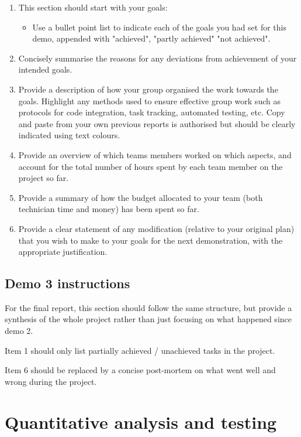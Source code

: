 \documentclass{article}
\begin{document}
\begin{enumerate}
    \item This section should start with your goals:
\begin{itemize}
    \item Use a bullet point list to indicate each of the goals you had set for this demo, appended with "achieved", "partly achieved" "not achieved".
\end{itemize}


\item Concisely summarise the reasons for any deviations from achievement of your intended goals.

\item Provide a description of how your group organised the work towards the goals. Highlight any methods used to ensure effective group work such as protocols for code integration, task tracking, automated testing, etc. Copy and paste from your own previous reports is authorised but should be clearly indicated using text colours.

\item Provide an overview of which teams members worked on which aspects, and account for the total number of hours spent by each team member on the project so far.

\item Provide a summary of how the budget allocated to your team (both technician time and money) has been spent so far.

\item Provide a clear statement of any modification (relative to your original plan) that you wish to make to your goals for the next demonstration, with the appropriate justification.

\end{enumerate}

\subsection*{Demo 3 instructions}
For the final report, this section should follow the same structure, but provide a synthesis of the whole project rather than just focusing on what happened since demo 2. 

Item 1 should only list partially achieved / unachieved tasks in the project.

Item 6 should be replaced by a concise post-mortem on what went well and wrong during the project.


\section{Quantitative analysis and testing}
\end{document}
